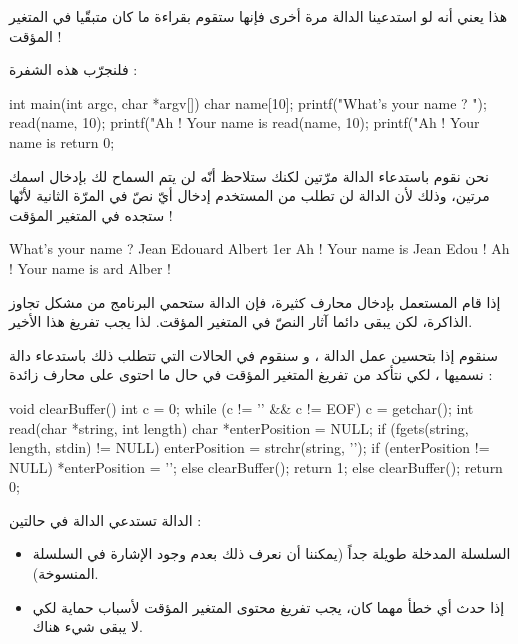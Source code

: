 هذا يعني أنه لو استدعينا الدالة
مرة أخرى فإنها ستقوم بقراءة ما كان متبقّيا في المتغير المؤقت !

فلنجرّب هذه الشفرة :

\begin{Csource}
int main(int argc, char *argv[])
{
 	char name[10];
 	printf("What's your name ? ");
 	read(name, 10);
 	printf("Ah ! Your name is %
 	read(name, 10);
 	printf("Ah ! Your name is %
 	return 0;
}
\end{Csource}

نحن نقوم باستدعاء الدالة
مرّتين لكنك ستلاحظ أنّه لن يتم السماح لك بإدخال اسمك مرتين، وذلك لأن الدالة
لن تطلب من المستخدم إدخال أيّ نصّ في المرّة الثانية لأنّها ستجده في المتغير المؤقت !

\begin{Console}
  What's your name ? Jean Edouard Albert 1er
  Ah ! Your name is Jean Edou !
  Ah ! Your name is ard Alber !
\end{Console}

إذا قام المستعمل بإدخال محارف كثيرة، فإن الدالة
ستحمي البرنامج من مشكل تجاوز الذاكرة، لكن يبقى دائما آثار النصّ في المتغير المؤقت. لذا يجب تفريغ هذا الأخير.

سنقوم إذا بتحسين عمل الدالة
،
و سنقوم في الحالات التي تتطلب ذلك باستدعاء دالة نسميها
،
لكي نتأكد من تفريغ المتغير المؤقت في حال ما احتوى على محارف زائدة :

\begin{Csource}
void clearBuffer()
{
 	int c = 0;
 	while (c != '\n' && c != EOF)
 	{
     		c = getchar();
 	}
}
int read(char *string, int length)
{
 	char *enterPosition = NULL;
 	if (fgets(string, length, stdin) != NULL)
 	{
     		enterPosition = strchr(string, '\n');
     		if (enterPosition != NULL)
     		{
         			*enterPosition = '\0';
     		}
     		else
     		{
         			clearBuffer();
     		}
     		return 1;
 	}
 	else
 	{
     		clearBuffer();
     		return 0;
	}
}
\end{Csource}

الدالة
تستدعي الدالة
في حالتين :

\begin{itemize}
  \item السلسلة المدخلة طويلة جداً (يمكننا أن نعرف ذلك بعدم وجود الإشارة
في السلسلة المنسوخة).
  \item إذا حدث أي خطأ مهما كان، يجب تفريغ محتوى المتغير المؤقت لأسباب حماية لكي لا يبقى شيء هناك.
\end{itemize}

